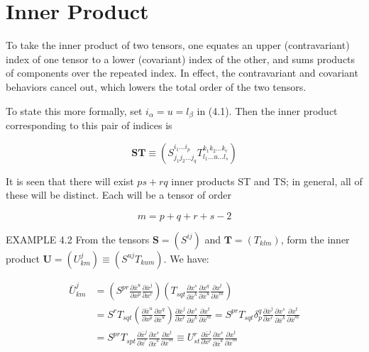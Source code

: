 \documentclass[10pt]{article}
\begin{document}
\section*{Inner Product}
To take the inner product of two tensors, one equates an upper (contravariant) index of one tensor to a lower (covariant) index of the other, and sums products of components over the repeated index. In effect, the contravariant and covariant behaviors cancel out, which lowers the total order of the two tensors.

To state this more formally, set $i_{\alpha}=u=l_{\beta}$ in (4.1). Then the inner product corresponding to this pair of indices is


\begin{equation*}
\mathbf{S T} \equiv\left(S_{j_{1} j_{2} \ldots j_{q}}^{i_{1} \ldots i_{p}} T_{l_{1} \ldots u \ldots l_{s}}^{k_{1} k_{2} \ldots k_{r}}\right) \tag{4.4}
\end{equation*}


It is seen that there will exist $p s+r q$ inner products ST and TS; in general, all of these will be distinct. Each will be a tensor of order

$$
m=p+q+r+s-2
$$

EXAMPLE 4.2 From the tensors $\mathbf{S}=\left(S^{i j}\right)$ and $\mathbf{T}=\left(T_{k l m}\right)$, form the inner product $\mathbf{U}=\left(U_{k m}^{j}\right) \equiv\left(S^{u j} T_{k u m}\right)$. We have:

$$
\begin{aligned}
\bar{U}_{k m}^{j} & =\left(S^{p r} \frac{\partial \bar{x}^{u}}{\partial x^{p}} \frac{\partial \bar{x}^{j}}{\partial x^{r}}\right)\left(T_{s q t} \frac{\partial x^{s}}{\partial \bar{x}^{k}} \frac{\partial x^{q}}{\partial \bar{x}^{u}} \frac{\partial x^{t}}{\partial \bar{x}^{m}}\right) \\
& =S^{r} T_{s q t}\left(\frac{\partial \bar{x}^{u}}{\partial x^{p}} \frac{\partial x^{q}}{\partial \bar{x}^{u}}\right) \frac{\partial \bar{x}^{j}}{\partial x^{r}} \frac{\partial x^{s}}{\partial \bar{x}^{k}} \frac{\partial x^{t}}{\partial \bar{x}^{m}}=S^{p r} T_{s q t} \delta_{p}^{q} \frac{\partial \bar{x}^{j}}{\partial x^{r}} \frac{\partial x^{s}}{\partial \bar{x}^{k}} \frac{\partial x^{t}}{\partial \bar{x}^{m}} \\
& =S^{p r} T_{s p t} \frac{\partial \bar{x}^{j}}{\partial \bar{x}^{r}} \frac{\partial x^{s}}{\partial \bar{x}^{k}} \frac{\partial x^{t}}{\partial \bar{x}^{m}} \equiv U_{s t}^{r} \frac{\partial \bar{x}^{j}}{\partial x^{r}} \frac{\partial x^{s}}{\partial \bar{x}^{k}} \frac{\partial x^{t}}{\partial \bar{x}^{m}}
\end{aligned}
$$
\end{document}
